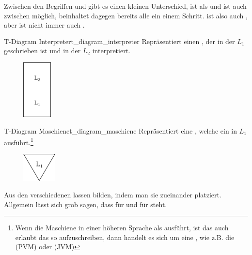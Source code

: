 \begin{Special_Paragraph}
Zwischen den Begriffen  und  gibt es einen kleinen Unterschied,  ist  als  und ist auch zwischen  möglich,  beinhaltet dagegen bereits alle  ein einem Schritt.  ist also auch , aber  ist nicht immer auch .
\end{Special_Paragraph}

\begin{Definition}{T-Diagram Interpreter}{t_diagram_interpreter}
  Repräsentiert einen , der in der  $L_1$ geschrieben ist und  in der  $L_2$ interpretiert.
  \begin{figure}[H]
    \centering
    \includegraphics[height=3cm]{./figures/interpreter.png}
  \end{figure}
\end{Definition}

\begin{Definition}{T-Diagram Maschiene}{t_diagram_maschiene}
  Repräsentiert eine , welche ein  in  $L_1$ ausführt.\footnote{Wenn die Maschiene  in einer höheren Sprache als  ausführt, ist das auch erlaubt das so aufzuschreiben, dann handelt es sich um eine , wie z.B. die  (PVM) oder  (JVM)}
  \begin{figure}[H]
    \centering
    \includegraphics[height=1.5cm]{./figures/machiene.png}
  \end{figure}
\end{Definition}

Aus den verschiedenen  lassen  bilden, indem man sie  zueinander platziert. Allgemein lässt sich grob sagen, dass  für  und   für  steht.

